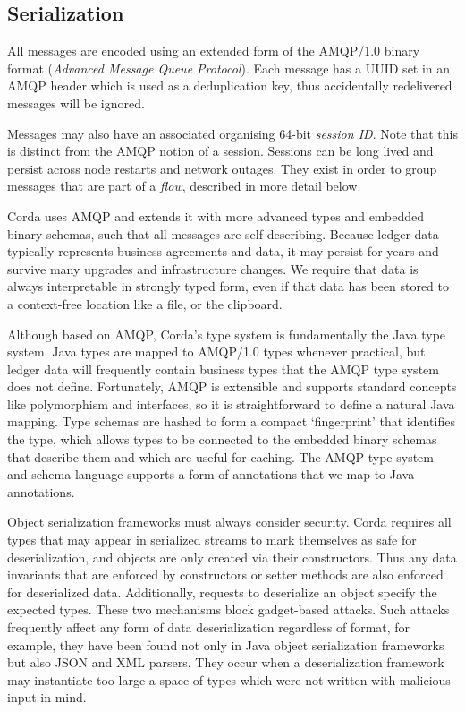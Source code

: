 \documentclass{article}
\begin{document}
\subsection{Serialization}\label{subsec:serialization}

All messages are encoded using an extended form of the AMQP/1.0 binary format (\emph{Advanced Message Queue
Protocol}\cite{AMQP}). Each message has a UUID set in an AMQP header which is used as a deduplication key, thus
accidentally redelivered messages will be ignored.

Messages may also have an associated organising 64-bit \emph{session ID}. Note that this is distinct from the AMQP
notion of a session. Sessions can be long lived and persist across node restarts and network outages. They exist in
order to group messages that are part of a \emph{flow}, described in more detail below.

Corda uses AMQP and extends it with more advanced types and embedded binary schemas, such that all messages are
self describing. Because ledger data typically represents business agreements and data, it may persist for years
and survive many upgrades and infrastructure changes. We require that data is always interpretable in strongly
typed form, even if that data has been stored to a context-free location like a file, or the clipboard.

Although based on AMQP, Corda's type system is fundamentally the Java type system. Java types are mapped to
AMQP/1.0 types whenever practical, but ledger data will frequently contain business types that the AMQP type system
does not define. Fortunately, AMQP is extensible and supports standard concepts like polymorphism and interfaces,
so it is straightforward to define a natural Java mapping. Type schemas are hashed to form a compact `fingerprint'
that identifies the type, which allows types to be connected to the embedded binary schemas that describe them and
which are useful for caching. The AMQP type system and schema language supports a form of annotations that we map
to Java annotations.

Object serialization frameworks must always consider security. Corda requires all types that may appear in
serialized streams to mark themselves as safe for deserialization, and objects are only created via their
constructors. Thus any data invariants that are enforced by constructors or setter methods are also enforced for
deserialized data. Additionally, requests to deserialize an object specify the expected types. These two mechanisms
block gadget-based attacks\cite{DeserialisingPickles}. Such attacks frequently affect any form of data
deserialization regardless of format, for example, they have been found not only in Java object serialization
frameworks but also JSON and XML parsers. They occur when a deserialization framework may instantiate too large a
space of types which were not written with malicious input in mind.
\end{document}
